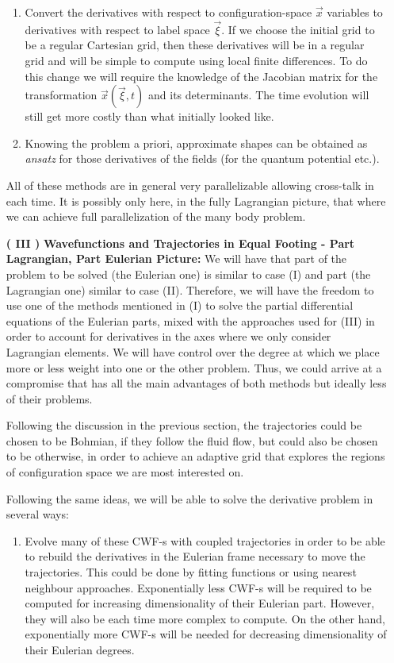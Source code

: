 \documentclass[11pt, a4paper]{article} %
\begin{document}
\begin{enumerate}
\begin{enumerate}
\item Convert the derivatives with respect to configuration-space $\vec{x}$ variables to derivatives with respect to label space $\vec{\xi}$. If we choose the initial grid to be a regular Cartesian grid, then these derivatives will be in a regular grid and will be simple to compute using local finite differences. To do this change we will require the knowledge of the Jacobian matrix for the transformation $\vec{x}(\vec{\xi},t)$ and its determinants. The time evolution will still get more costly than what initially looked like.


\item Knowing the problem a priori, approximate shapes can be obtained as {\em ansatz} for those derivatives of the fields (for the quantum potential etc.).

\end{enumerate}
All of these methods are in general very parallelizable allowing cross-talk in each time. It is possibly only here, in the fully Lagrangian picture, that where we can achieve full parallelization of the many body problem.

\item [\bf ( III )] {\bf Wavefunctions and Trajectories in Equal Footing - Part Lagrangian, Part Eulerian Picture:} We will have that part of the problem to be solved (the Eulerian one) is similar to case (I) and part (the Lagrangian one) similar to case (II). Therefore, we will have the freedom to use one of the methods mentioned in (I) to solve the partial differential equations of the Eulerian parts, mixed with the approaches used for (III) in order to account for derivatives in the axes where we only consider Lagrangian elements. We will have control over the degree at which we place more or less weight into one or the other problem. Thus, we could arrive at a compromise that has all the main advantages of both methods but ideally less of their problems.

Following the discussion in the previous section, the trajectories could be chosen to be Bohmian, if they follow the fluid flow, but could also be chosen to be otherwise, in order to achieve an adaptive grid that explores the regions of configuration space we are most interested on.

Following the same ideas, we will be able to solve the derivative problem in several ways:
\begin{enumerate}
\item Evolve many of these CWF-s with coupled trajectories in order to be able to rebuild the derivatives in the Eulerian frame necessary to move the trajectories. This could be done by fitting functions or using nearest neighbour approaches. Exponentially less CWF-s will be required to be computed for increasing dimensionality of their Eulerian part. However, they will also be each time more complex to compute. On the other hand, exponentially more CWF-s will be needed for decreasing dimensionality of their Eulerian degrees.


\end{enumerate}
\end{enumerate}
\end{document}
